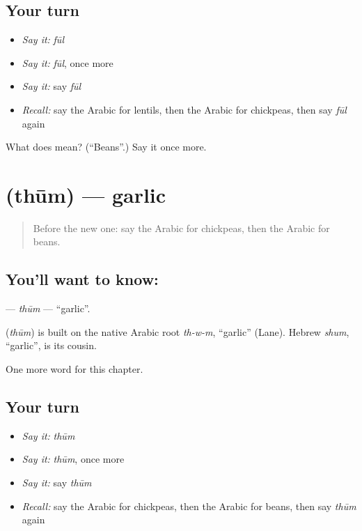 \subsection*{Your turn}
\begin{itemize}
\raggedright
  \item \emph{Say it:} \emph{fūl}
  \item \emph{Say it:} \emph{fūl}, once more
  \item \emph{Say it:} say \emph{fūl}
  \item \emph{Recall:} say the Arabic for lentils, then the Arabic for chickpeas, then say \emph{fūl} again
\end{itemize}

\begin{tcolorbox}[breakable,colback=teal!4,colframe=teal!35!black,title={Before you move on}]
What does  mean? (\textquotedblleft{}Beans\textquotedblright{}.) Say it once more.
\end{tcolorbox}
\section[\texorpdfstring{\ar{ثوم} (thūm)}{ثوم (thūm)}]{ (thūm) — garlic}

\label{lesson:AR-C129-thum}



\begin{quote}
Before the new one: say the Arabic for chickpeas, then the Arabic for beans.
\end{quote}

\subsection*{You'll want to know: }
\textbf{} — \emph{thūm} — \textquotedblleft{}garlic\textquotedblright{}.

\begin{cousinweb}
\textbf{} (\emph{thūm}) is built on the native Arabic root \emph{th-w-m}, \textquotedblleft{}garlic\textquotedblright{} (Lane). Hebrew \emph{shum}, \textquotedblleft{}garlic\textquotedblright{}, is its cousin.
\end{cousinweb}

\begin{grammarlens}[title={What you've built}]
One more word for this chapter.
\end{grammarlens}

\subsection*{Your turn}
\begin{itemize}
\raggedright
  \item \emph{Say it:} \emph{thūm}
  \item \emph{Say it:} \emph{thūm}, once more
  \item \emph{Say it:} say \emph{thūm}
  \item \emph{Recall:} say the Arabic for chickpeas, then the Arabic for beans, then say \emph{thūm} again
\end{itemize}

